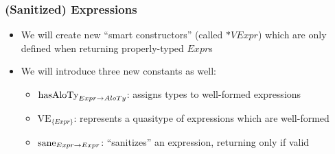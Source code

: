 \documentclass[xcolor={dvipsnames}]{beamer}
\begin{document}
\begin{frame}
\frametitle{(Sanitized) Expressions}
\begin{itemize}
\item We will create new ``smart constructors'' (called $*VExpr$) which are only defined when returning 
properly-typed $Expr$s
\item We will introduce three new constants as well:

\begin{itemize}
\item $\text{hasAloTy}_{{Expr} \rightarrow {AloTy}}$: assigns types to well-formed expressions

\item$\text{VE}_{\{Expr\}}$: represents a quasitype of expressions which are well-formed

\item$\text{sane}_{{Expr} \rightarrow {Expr}}$: ``sanitizes'' an expression, returning only if valid
\end{itemize}
\end{itemize}
\end{frame}
\end{document}
